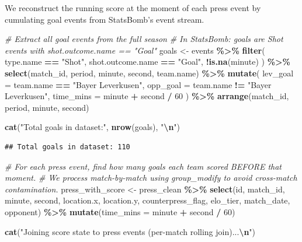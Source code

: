 \documentclass[
]{article}
\newenvironment{Shaded}{\begin{snugshade}}{\end{snugshade}}
\newcommand{\AttributeTok}[1]{\textcolor[rgb]{0.13,0.29,0.53}{#1}}
\newcommand{\CommentTok}[1]{\textcolor[rgb]{0.56,0.35,0.01}{\textit{#1}}}
\newcommand{\DecValTok}[1]{\textcolor[rgb]{0.00,0.00,0.81}{#1}}
\newcommand{\FunctionTok}[1]{\textcolor[rgb]{0.13,0.29,0.53}{\textbf{#1}}}
\newcommand{\NormalTok}[1]{#1}
\newcommand{\OtherTok}[1]{\textcolor[rgb]{0.56,0.35,0.01}{#1}}
\newcommand{\SpecialCharTok}[1]{\textcolor[rgb]{0.81,0.36,0.00}{\textbf{#1}}}
\newcommand{\StringTok}[1]{\textcolor[rgb]{0.31,0.60,0.02}{#1}}
\begin{document}
We reconstruct the running score at the moment of each press event by
cumulating goal events from StatsBomb's event stream.

\begin{Shaded}
\begin{Highlighting}[]
\CommentTok{\# Extract all goal events from the full season}
\CommentTok{\# In StatsBomb: goals are Shot events with shot.outcome.name == "Goal"}
\NormalTok{goals }\OtherTok{\textless{}{-}}\NormalTok{ events }\SpecialCharTok{\%\textgreater{}\%}
  \FunctionTok{filter}\NormalTok{(}
\NormalTok{    type.name         }\SpecialCharTok{==} \StringTok{"Shot"}\NormalTok{,}
\NormalTok{    shot.outcome.name }\SpecialCharTok{==} \StringTok{"Goal"}\NormalTok{,}
    \SpecialCharTok{!}\FunctionTok{is.na}\NormalTok{(minute)}
\NormalTok{  ) }\SpecialCharTok{\%\textgreater{}\%}
  \FunctionTok{select}\NormalTok{(match\_id, period, minute, second, team.name) }\SpecialCharTok{\%\textgreater{}\%}
  \FunctionTok{mutate}\NormalTok{(}
    \AttributeTok{lev\_goal  =}\NormalTok{ team.name }\SpecialCharTok{==} \StringTok{"Bayer Leverkusen"}\NormalTok{,}
    \AttributeTok{opp\_goal  =}\NormalTok{ team.name }\SpecialCharTok{!=} \StringTok{"Bayer Leverkusen"}\NormalTok{,}
    \AttributeTok{time\_mins =}\NormalTok{ minute }\SpecialCharTok{+}\NormalTok{ second }\SpecialCharTok{/} \DecValTok{60}
\NormalTok{  ) }\SpecialCharTok{\%\textgreater{}\%}
  \FunctionTok{arrange}\NormalTok{(match\_id, period, minute, second)}

\FunctionTok{cat}\NormalTok{(}\StringTok{"Total goals in dataset:"}\NormalTok{, }\FunctionTok{nrow}\NormalTok{(goals), }\StringTok{"}\SpecialCharTok{\textbackslash{}n}\StringTok{"}\NormalTok{)}
\end{Highlighting}
\end{Shaded}

\begin{verbatim}
## Total goals in dataset: 110
\end{verbatim}

\begin{Shaded}
\begin{Highlighting}[]
\CommentTok{\# For each press event, find how many goals each team scored BEFORE that moment.}
\CommentTok{\# We process match{-}by{-}match using group\_modify to avoid cross{-}match contamination.}
\NormalTok{press\_with\_score }\OtherTok{\textless{}{-}}\NormalTok{ press\_clean }\SpecialCharTok{\%\textgreater{}\%}
  \FunctionTok{select}\NormalTok{(id, match\_id, minute, second,}
\NormalTok{         location.x, location.y,}
\NormalTok{         counterpress\_flag, elo\_tier,}
\NormalTok{         match\_date, opponent) }\SpecialCharTok{\%\textgreater{}\%}
  \FunctionTok{mutate}\NormalTok{(}\AttributeTok{time\_mins =}\NormalTok{ minute }\SpecialCharTok{+}\NormalTok{ second }\SpecialCharTok{/} \DecValTok{60}\NormalTok{)}

\FunctionTok{cat}\NormalTok{(}\StringTok{"Joining score state to press events (per{-}match rolling join)...}\SpecialCharTok{\textbackslash{}n}\StringTok{"}\NormalTok{)}
\end{Highlighting}
\end{Shaded}
\end{document}
